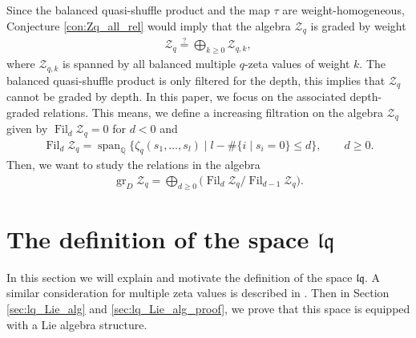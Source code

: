 \documentclass[12pt,reqno]{amsart}
\numberwithin{equation}{section}
\theoremstyle{definition}
\newcommand{\QQ}{\mathbb{Q}}
\newcommand{\Z}{\mathcal{Z}}
\newcommand{\grDZ}{\operatorname{gr}_D\Z}
\newcommand{\fil}{\operatorname{Fil}}
\newcommand{\lqq}{\mathfrak{lq}}
\begin{document}
Since the balanced quasi-shuffle product and the map $\tau$ are weight-homogeneous, Conjecture \ref{con:Zq_all_rel} would imply that the algebra $\Z_q$ is graded by weight
\begin{align*}
\Z_q \overset{?}{=} \bigoplus_{k\geq0} \Z_{q,k},
\end{align*}
where $\Z_{q,k}$ is spanned by all balanced multiple $q$-zeta values of weight $k$. The balanced quasi-shuffle product is only filtered for the depth, this implies that $\Z_q$ cannot be graded by depth. In this paper, we focus on the associated depth-graded relations. This means, we define a increasing filtration on the algebra $\Z_q$ given by $\fil_d\Z_q=0$ for $d<0$ and
\begin{align*}
\fil_d \Z_q=\operatorname{span}_\QQ\{\zeta_q(s_1,\ldots,s_l)\mid l-\#\{i\mid s_i=0\}\leq d\}, \qquad d\geq0.
\end{align*}
Then, we want to study the relations in the algebra
\begin{align} \label{eq:def_grDZq}
\grDZ_q=\bigoplus_{d\geq0} \big(\fil_d \Z_q/ \fil_{d-1}\Z_q\big).
\end{align}

\section{The definition of the space $\lqq$} \label{sec:def_lq}

In this section we will explain and motivate the definition of the space $\lqq$. A similar consideration for multiple zeta values is described in \cite{ENR03}. Then in Section \ref{sec:lq_Lie_alg} and \ref{sec:lq_Lie_alg_proof}, we prove that this space is equipped with a Lie algebra structure.
\end{document}
